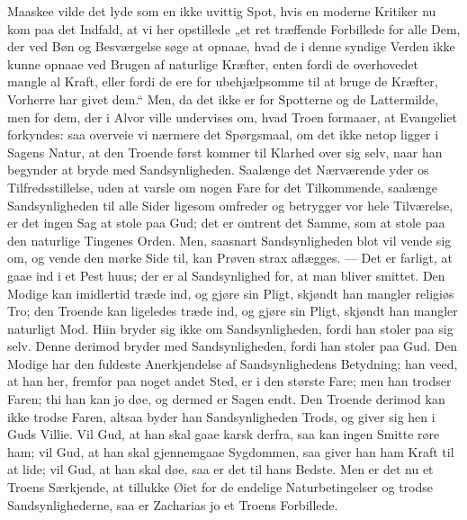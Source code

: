 \documentclass[12pt,a4paper]{book}
\begin{document}
Maaskee vilde det lyde som en ikke uvittig Spot, hvis en moderne Kritiker
nu kom paa det Indfald, at vi her opstillede „et ret træffende Forbillede
for alle Dem, der ved Bøn og Besværgelse søge at opnaae, hvad de i denne
syndige Verden ikke kunne opnaae ved Brugen af naturlige Kræfter, enten
fordi de overhovedet mangle al Kraft, eller fordi de ere for
ubehjælpsomme til at bruge de Kræfter, Vorherre har givet dem.“ Men, da
det ikke er for Spotterne og de Lattermilde, men for dem, der i Alvor
ville undervises om, hvad Troen formaaer, at Evangeliet forkyndes: saa
overveie vi nærmere det Spørgsmaal, om det ikke netop ligger i Sagens
Natur, at den Troende først kommer til Klarhed over sig selv, naar han
begynder at bryde med Sandsynligheden. Saalænge det Nærværende yder os
Tilfredsstillelse, uden at varsle om nogen Fare for det Tilkommende,
saalænge Sandsynligheden til alle Sider ligesom omfreder og betrygger vor
hele Tilværelse, er det ingen Sag at stole paa Gud; det er omtrent det
Samme, som at stole paa den naturlige Tingenes Orden. Men, saasnart
Sandsynligheden blot vil vende sig om, og vende den mørke Side til, kan
Prøven strax aflægges. --- Det er farligt, at gaae ind i et Pest\-%
huus; der er al Sandsynlighed for, at man bliver smittet. Den Modige kan
imidlertid træde ind, og gjøre sin Pligt, skjøndt han mangler religiøs
Tro; den Troende kan ligeledes træde ind, og gjøre sin Pligt, skjøndt han
mangler naturligt Mod. Hiin bryder sig ikke om Sandsynligheden, fordi han
stoler paa sig selv. Denne derimod bryder med Sandsynligheden, fordi han
stoler paa Gud. Den Modige har den fuldeste Anerkjendelse af
Sandsynlighedens Betydning; han veed, at han her, fremfor paa noget andet
Sted, er i den største Fare; men han trodser Faren; thi han kan jo døe,
og dermed er Sagen endt. Den Troende derimod kan ikke trodse Faren,
altsaa byder han Sandsynligheden Trods, og giver sig hen i Guds Villie.
Vil Gud, at han skal gaae karsk derfra, saa kan ingen Smitte røre ham;
vil Gud, at han skal gjennemgaae Sygdommen, saa giver han ham Kraft til
at lide; vil Gud, at han skal døe, saa er det til hans Bedste. Men er det
nu et Troens Særkjende, at tillukke Øiet for de endelige
Naturbetingelser og trodse Sandsynlighederne, saa er Zacharias jo et
Troens Forbillede.
\end{document}
